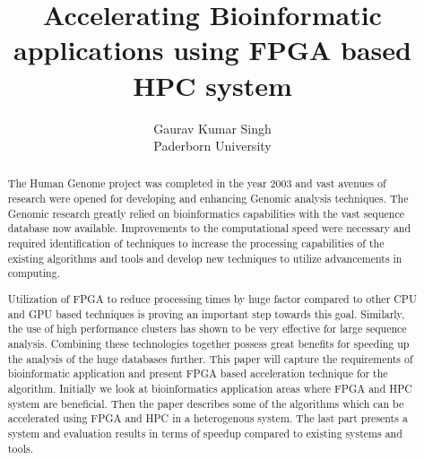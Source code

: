 \documentclass[12pt,twoside]{article}
\newcommand{\participant}{Gaurav Kumar Singh}
\newcommand{\affiliation}{Paderborn University}
\newcommand{\topic}{Accelerating Bioinformatic applications using FPGA based HPC system}
\begin{document}
\title{\topic}
\author{\Large{\participant}\\ \affiliation \\ {\small \emailaddress}}
\date{}
\maketitle
\thispagestyle{empty}


\begin{abstract}

 The Human Genome project was completed in the year 2003 and vast avenues 
 of research were opened for developing and enhancing Genomic analysis techniques. The Genomic
 research greatly relied on bioinformatics capabilities with the vast sequence
 database now available. Improvements to the computational speed were necessary and required identification of
 techniques to increase the processing capabilities of the existing algorithms and tools and develop
 new techniques to utilize advancements in computing.
 
 Utilization of FPGA to reduce processing times by huge factor compared to other CPU and GPU based techniques
 is proving an important step towards this goal. Similarly, the use of high performance clusters has shown
 to be very effective for large sequence analysis. Combining these technologies together possess great benefits
 for speeding up the analysis of the huge databases further. This paper will capture the requirements of bioinformatic
 application and present FPGA based acceleration technique for the \textcite{smith_identification_1981} algorithm.
 Initially we look at bioinformatics application areas where FPGA and HPC system are beneficial. Then the paper describes
 some of the algorithms which can be accelerated using FPGA and HPC in a heterogenous system. The last part presents
 a system and evaluation results in terms of speedup compared to existing systems and tools.

\end{abstract}

\end{document}
